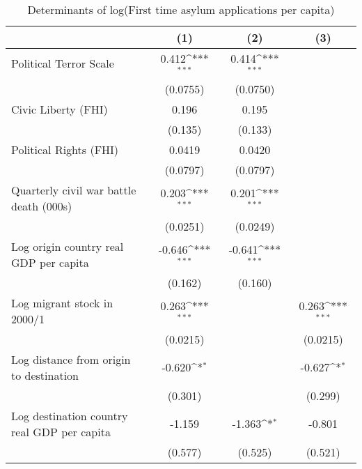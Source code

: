 \begin{table}[htbp]\centering
\def\sym#1{\ifmmode^{#1}\else\(^{#1}\)\fi}
\caption{Determinants of log(First time asylum applications per capita)}
\begin{tabular}{l*{3}{c}}
\hline\hline
                    &\multicolumn{1}{c}{(1)}         &\multicolumn{1}{c}{(2)}         &\multicolumn{1}{c}{(3)}         \\
\hline
Political Terror Scale&       0.412\sym{***}&       0.414\sym{***}&                     \\
                    &    (0.0755)         &    (0.0750)         &                     \\
[1em]
Civic Liberty (FHI) &       0.196         &       0.195         &                     \\
                    &     (0.135)         &     (0.133)         &                     \\
[1em]
Political Rights (FHI)&      0.0419         &      0.0420         &                     \\
                    &    (0.0797)         &    (0.0797)         &                     \\
[1em]
Quarterly civil war battle death (000s)&       0.203\sym{***}&       0.201\sym{***}&                     \\
                    &    (0.0251)         &    (0.0249)         &                     \\
[1em]
Log origin country real GDP per capita&      -0.646\sym{***}&      -0.641\sym{***}&                     \\
                    &     (0.162)         &     (0.160)         &                     \\
[1em]
Log migrant stock in 2000/1&       0.263\sym{***}&                     &       0.263\sym{***}\\
                    &    (0.0215)         &                     &    (0.0215)         \\
[1em]
Log distance from origin to destination&      -0.620\sym{*}  &                     &      -0.627\sym{*}  \\
                    &     (0.301)         &                     &     (0.299)         \\
[1em]
Log destination country real GDP per capita&      -1.159         &      -1.363\sym{*}  &      -0.801         \\
                    &     (0.577)         &     (0.525)         &     (0.521)         \\

\end{tabular}
\end{table}
